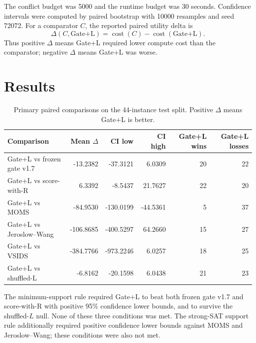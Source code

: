 \documentclass[11pt,a4paper]{article}
\begin{document}
The conflict budget was 5000 and the runtime budget was 30 seconds. Confidence
intervals were computed by paired bootstrap with 10000 resamples and seed
72072. For a comparator $C$, the reported paired utility delta is
\[
  \Delta(C,\text{Gate+L})
  =
  \operatorname{cost}(C)-\operatorname{cost}(\text{Gate+L}).
\]
Thus positive $\Delta$ means Gate+L required lower compute cost than the
comparator; negative $\Delta$ means Gate+L was worse.

\section{Results}

\begin{table}[h]
\centering
\small
\setlength{\tabcolsep}{4pt}
\caption{Primary paired comparisons on the 44-instance test split. Positive
$\Delta$ means Gate+L is better.}
\begin{tabular}{lrrrrr}
\toprule
Comparison & Mean $\Delta$ & CI low & CI high & Gate+L wins & Gate+L losses \\
\midrule
Gate+L vs frozen gate v1.7 & -13.2382 & -37.3121 & 6.0309 & 20 & 22 \\
Gate+L vs score-with-R & 6.3392 & -8.5437 & 21.7627 & 22 & 20 \\
Gate+L vs MOMS & -84.9530 & -130.0199 & -44.5361 & 5 & 37 \\
Gate+L vs Jeroslow--Wang & -106.8685 & -400.5297 & 64.2660 & 15 & 27 \\
Gate+L vs VSIDS & -384.7766 & -973.2246 & 6.0257 & 18 & 25 \\
Gate+L vs shuffled-L & -6.8162 & -20.1598 & 6.0438 & 21 & 23 \\
\bottomrule
\end{tabular}
\end{table}

The minimum-support rule required Gate+L to beat both frozen gate v1.7 and
score-with-R with positive 95\% confidence lower bounds, and to survive the
shuffled-$L$ null. None of these three conditions was met. The strong-SAT
support rule additionally required positive confidence lower bounds against
MOMS and Jeroslow--Wang; these conditions were also not met.
\end{document}
